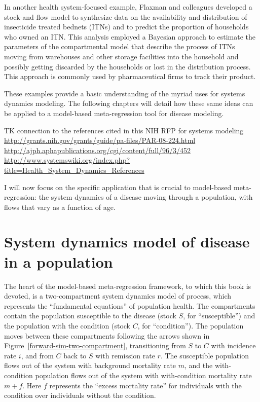 In another health system-focused example, Flaxman and colleagues
developed a stock-and-flow model to synthesize data on the
availability and distribution of insecticide treated bednets (ITNs)
and to predict the proportion of households who owned an ITN. This
analysis employed a Bayesian approach to estimate the parameters of
the compartmental model that describe the process of ITNs moving from
warehouses and other storage facilities into the household and
possibly getting discarded by the households or lost in the
distribution process.  This approach is commonly used by
pharmaceutical firms to track their product.

These examples provide a basic understanding of the myriad uses for
systems dynamics modeling. The following chapters will detail how
these same ideas can be applied to a model-based meta-regression tool
for disease modeling.




TK connection to the references cited in this NIH RFP for systems modeling
\url{http://grants.nih.gov/grants/guide/pa-files/PAR-08-224.html}
\url{http://ajph.aphapublications.org/cgi/content/full/96/3/452}
\url{http://www.systemswiki.org/index.php?title=Health_System_Dynamics_References}




I will now focus on the specific application that is crucial to
model-based meta-regression: the system dynamics of a disease moving
through a population, with flows that vary as a function of age.

\section{System dynamics model of disease in a population}

The heart of the model-based meta-regression framework, to which this
book is devoted, is a two-compartment system dynamics model of
process, which represents the ``fundamental equations'' of population
health. The compartments contain the population susceptible to the
disease (stock $S$, for ``susceptible'') and the population with the
condition (stock $C$, for ``condition''). The population moves between
these compartments following the arrows shown in
Figure~\ref{forward-sim-two-compartment}, transitioning from $S$ to
$C$ with incidence rate $i$, and from $C$ back to $S$ with remission
rate $r$. The susceptible population flows out of the system with
background mortality rate $m$, and the with-condition
population flows out of the system with with-condition mortality rate
$m+f$.  Here $f$ represents the ``excess mortality rate'' for
individuals with the condition over individuals without the condition.

